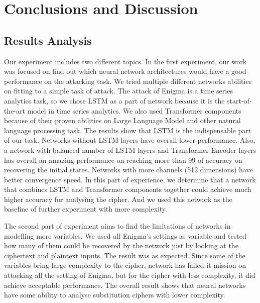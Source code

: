\chapter{Conclusions and Discussion}
\section{Results Analysis}
Our experiment includes two different topics. In the first experiment, our work was focused on find out which neural network architectures would have a good performance on the attacking task. We tried multiple different networks abilities on fitting to a simple task of attack. The attack of Enigma is a time series analytics task, so we chose LSTM as a part of network because it is the start-of-the-art model in time series analytics. We also used Transformer components because of their proven abilities on Large Language Model and other natural language processing task. The results show that LSTM is the indispensable part of our task. Networks without LSTM layers have overall lower performance. Also, a network with balanced number of LSTM layers and Transformer Encoder layers has overall an amazing performance on reaching more than 99 of accuracy on recovering the initial states. Networks with more channels (512 dimensions) have better convergence speed. In this part of experience, we determine that a network that combines LSTM and Transformer components together could achieve much higher accuracy for analysing the cipher. And we used this network as the baseline of further experiment with more complexity.

The second part of experiment aims to find the limitations of networks in modelling more variables. We used all Enigma’s settings as variable and tested how many of them could be recovered by the network just by looking at the ciphertext and plaintext inputs. The result was as expected. Since some of the variables bring large complexity to the cipher, network has failed it mission on attacking all the setting of Enigma, but for the cipher with less complexity, it did achieve acceptable performance. The overall result shows that neural networks have some ability to analyse substitution ciphers with lower complexity. 

